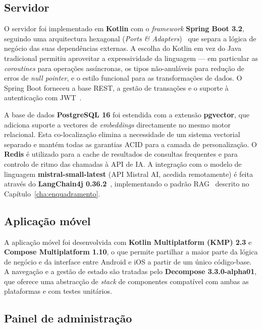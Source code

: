 \subsection*{Servidor}

O servidor foi implementado em \textbf{Kotlin} com o \emph{framework} \textbf{Spring Boot 3.2}, seguindo uma arquitectura hexagonal (\emph{Ports \& Adapters})~\cite{cockburn2005hexagonal} que separa a lógica de negócio das suas dependências externas. A escolha do Kotlin em vez do Java tradicional permitiu aproveitar a expressividade da linguagem --- em particular as \emph{coroutines} para operações assíncronas, os tipos não-anuláveis para redução de erros de \emph{null pointer}, e o estilo funcional para as transformações de dados. O Spring Boot forneceu a base REST, a gestão de transações e o suporte à autenticação com JWT~\cite{rfc7519}.

A base de dados \textbf{PostgreSQL 16} foi estendida com a extensão \textbf{pgvector}, que adiciona suporte a vectores de \emph{embeddings} directamente no mesmo motor relacional. Esta co-localização elimina a necessidade de um sistema vectorial separado e mantém todas as garantias ACID para a camada de personalização. O \textbf{Redis} é utilizado para a cache de resultados de consultas frequentes e para controlo de ritmo das chamadas à API de IA. A integração com o modelo de linguagem \textbf{mistral-small-latest} (API Mistral AI, acedida remotamente) é feita através do \textbf{LangChain4j 0.36.2}~\cite{langchain4j}, implementando o padrão RAG~\cite{lewis2020rag} descrito no Capítulo~\ref{cha:enquadramento}.

\subsection*{Aplicação móvel}

A aplicação móvel foi desenvolvida com \textbf{Kotlin Multiplatform (KMP) 2.3} e \textbf{Compose Multiplatform 1.10}, o que permite partilhar a maior parte da lógica de negócio e da interface entre Android e iOS a partir de um único código-base. A navegação e a gestão de estado são tratadas pelo \textbf{Decompose 3.3.0-alpha01}, que oferece uma abstracção de \emph{stack} de componentes compatível com ambas as plataformas e com testes unitários.

\subsection*{Painel de administração}

